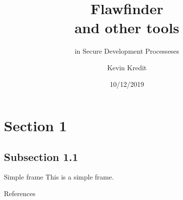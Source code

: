 \documentclass{beamer}
\title{Flawfinder \\ and other tools}
\subtitle{in Secure Development Processeses}
\author{Kevin Kredit}
\institute{GVSU \\ CIS 618}
\date{10/12/2019}
\begin{document}
  \begin{frame}
    \maketitle
  \end{frame}



\section{Section 1}

\subsection{Subsection 1.1}
  \begin{frame}{Simple frame}
    This is a simple frame.
  \end{frame}

\appendix
  \begin{frame}{References}
    \nocite{*}
    
    
  \end{frame}
\end{document}
